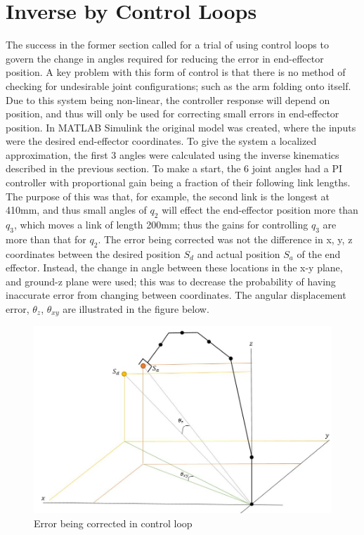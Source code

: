 \documentclass[12pt,openany,a4paper]{book}
\begin{document}
\section{Inverse by Control Loops}
The success in the former section called for a trial of using control loops to govern the change in angles required for reducing the error in end-effector position. A key problem with this form of control is that there is no method of checking for undesirable joint configurations; such as the arm folding onto itself. Due to this system being non-linear, the controller response will depend on position, and thus will only be used for correcting small errors in end-effector position. In MATLAB Simulink the original model was created, where the inputs were the desired end-effector coordinates. To give the system a localized approximation, the first 3 angles were calculated using the inverse kinematics described in the previous section. To make a start, the 6 joint angles had a PI controller with proportional gain being a fraction of their following link lengths. The purpose of this was that, for example, the second link is the longest at 410mm, and thus small angles of $q_2$ will effect the end-effector position more than $q_3$, which moves a link of length 200mm; thus the gains for controlling $q_3$ are more than that for $q_2$. The error being corrected was not the difference in x, y, z coordinates between the desired position $S_d$ and actual position $S_a$ of the end effector. Instead, the change in angle between these locations in the x-y plane, and ground-z plane were used; this was to decrease the probability of having inaccurate error from changing between coordinates. The angular displacement error, $\theta_z$, $\theta_{xy}$ are illustrated in the figure below.


\begin{center}
\begin{figure}[htb]
  \includegraphics[width=1\linewidth]{jaco_inv_control_figure.jpg}
\caption{Error being corrected in control loop}
\end{figure}
\end{center}
\end{document}
